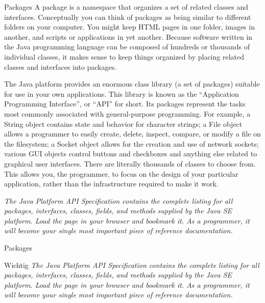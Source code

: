 \documentclass[18pt]{beamer}
\begin{document}
\begin{frame}{Packages}
\scriptsize
A package is a namespace that organizes a set of related classes and interfaces. 
Conceptually you can think of packages as being similar to different folders on your computer. 
You might keep HTML pages in one folder, images in another, and scripts or applications in yet another. 
Because software written in the Java programming language can be composed of hundreds or thousands of 
individual classes, it makes sense to keep things organized by placing related classes and interfaces into packages.

The Java platform provides an enormous class library (a set of packages) suitable for use in your own 
applications. This library is known as the ``Application Programming Interface'', or ``API'' for short. 
Its packages represent the tasks most commonly associated with general-purpose programming. For example, 
a String object contains state and behavior for character strings; a File object allows a programmer to easily 
create, delete, inspect, compare, or modify a file on the filesystem; a Socket object allows for the creation
and use of network sockets; various GUI objects control buttons and checkboxes and anything else related to 
graphical user interfaces. There are literally thousands of classes to choose from. This allows you, the programmer, 
to focus on the design of your particular application, rather than the infrastructure required to make it work.

\emph{The Java Platform API Specification contains the complete listing for all packages, interfaces, classes, fields, 
and methods supplied by the Java SE platform. Load the page in your browser and bookmark it. As a programmer, 
it will become your single most important piece of reference documentation.}

\end{frame}

\begin{frame}{Packages}
\begin{alertblock}{Wichtig}
\Large
\emph{The Java Platform API Specification contains the complete listing for all packages, interfaces, classes, fields, 
and methods supplied by the Java SE platform. Load the page in your browser and bookmark it. As a programmer, 
it will become your single most important piece of reference documentation.}
 
\end{alertblock}

\end{frame}
\end{document}
